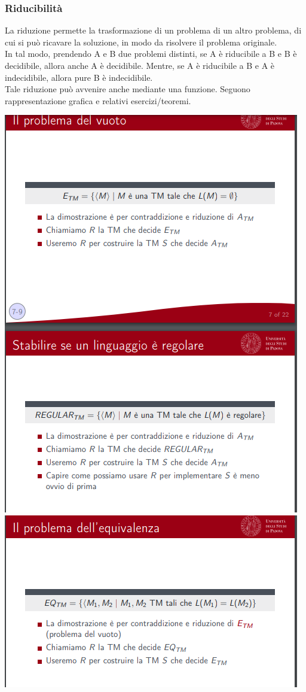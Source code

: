 \documentclass[]{article}
\begin{document}
			\subsubsection{Riducibilità}
				La riduzione permette la trasformazione di un problema di un altro problema, di cui si può ricavare la soluzione, in modo da risolvere il problema originale.\\
				In tal modo, prendendo A e B due problemi distinti, se A è riducibile a B e B è decidibile, allora anche A è decidibile. Mentre, se A è riducibile a B e A è indecidibile, allora pure B è indecidibile.\\
				Tale riduzione può avvenire anche mediante una funzione. Seguono rappresentazione grafica e relativi esercizi/teoremi.
				\begin{center}
					\includegraphics[scale=0.8]{riducibile1.png}
					\includegraphics[scale=0.8]{riducibile2.png}

\end{center}
\end{document}
